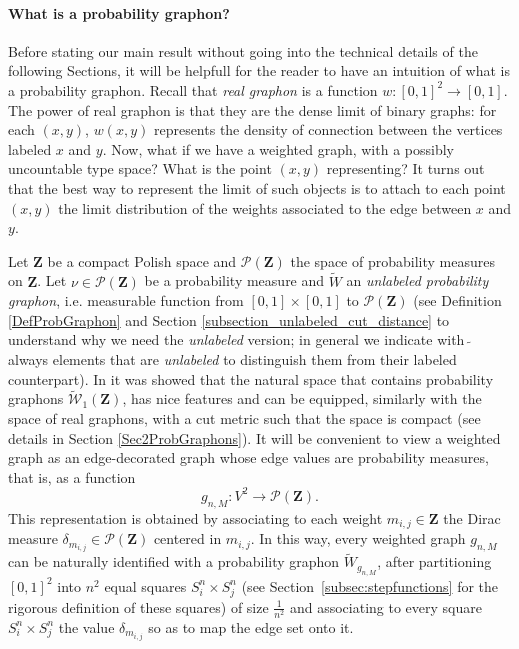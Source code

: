 \documentclass[12pt,twoside,a4paper]{article}
\newcommand{\Square}{{S^n_i\times S^n_j}}
\newcommand{\Space}{\mathbf{Z}}
\begin{document}
\paragraph{What is a probability graphon?} Before stating our main result without going into the technical details of the following Sections, it will be helpfull for the reader to have an intuition of what is a probability graphon. Recall that \emph{real graphon} is a function $w:[0,1]^2\to [0,1]$. The power of real graphon is that they are the dense limit of binary graphs: for each $(x,y)$, $w(x,y)$ represents the density of connection between the vertices labeled $x$ and $y$. Now, what if we have a weighted graph, with a possibly uncountable type space? What is the point $(x,y)$ representing? It turns out that the best way to represent the limit of such objects is to attach to each point $(x,y)$ the limit distribution of the weights associated to the edge between $x$ and $y$. 


Let $\Space$ be a compact Polish space and $\mathcal{P}(\Space)$ the space of probability measures on $\Space$. Let $\nu\in\mathcal{P}(\Space)$ be a probability measure and $\widetilde{W}$ an \emph{unlabeled probability graphon}, i.e. measurable function from $[0,1]\times[0,1]$ to $\mathcal{P}(\Space)$ (see Definition \ref{DefProbGraphon} and Section \ref{subsection_unlabeled_cut_distance} to understand why we need the \emph{unlabeled} version; in general we indicate with $\,\widetilde{}\,$ always elements that are \emph{unlabeled} to distinguish them from their labeled counterpart). In \cite{abraham2023probabilitygraphons} it was showed that the natural space that contains probability graphons $\widetilde{\mathcal{W}}_1(\Space)$, has nice features and can be equipped, similarly with the space of real graphons, with a cut metric such that the space is compact (see details in Section \ref{Sec2ProbGraphons}). It will be convenient to view a weighted graph as an edge-decorated graph whose edge values are probability measures, that is, as a function 
\[
g_{n,M} : V^2 \to \mathcal{P}(\Space).
\]
This representation is obtained by associating to each weight $m_{i,j} \in \Space$ the Dirac measure $\delta_{m_{i,j}} \in \mathcal{P}(\Space)$ centered in $m_{i,j}$. In this way, every weighted graph $g_{n,M}$ can be naturally identified with a probability graphon $\widetilde{W}_{g_{n,M}}$, after partitioning $[0,1]^2$ into $n^2$ equal squares $\Square$ (see Section~\ref{subsec:stepfunctions} for the rigorous definition of these squares) of size $\tfrac{1}{n^2}$ and associating to every square $\Square$ the value $\delta_{m_{i,j}}$
so as to map the edge set onto it.
\end{document}

